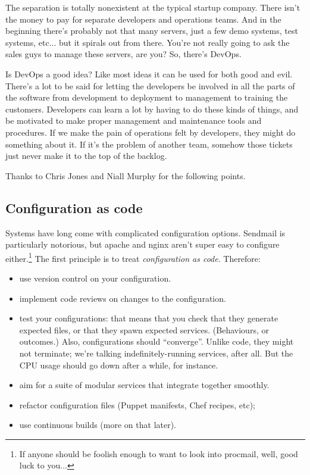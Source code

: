 \documentclass[a4paper]{report}
\begin{document}
The separation is totally nonexistent at the typical startup company. There isn't the money to pay for separate developers and operations teams. And in the beginning there's probably not that many servers, just a few demo systems, test systems, etc... but it spirals out from there. You're not really going to ask the sales guys to manage these servers, are you? So, there's DevOps. 

Is DevOps a good idea? Like most ideas it can be used for both good and evil. There's a lot to be said for letting the developers be involved in all the parts of the software from development to deployment to management to training the customers. Developers can learn a lot by having to do these kinds of things, and be motivated to make proper management and maintenance tools and procedures. If we make the pain of operations felt by developers, they might do something about it. If it's the problem of another team, somehow those tickets just never make it to the top of the backlog.

Thanks to Chris Jones and Niall Murphy for the following points.

\subsection*{Configuration as code}
Systems have long come with complicated configuration options.
Sendmail is particularly notorious, but apache and nginx aren't super
easy to configure either.\footnote{If anyone should be foolish enough to want to look into procmail, well, good luck to you...} The first principle is to treat \emph{configuration as code}.
Therefore:
\begin{itemize}
\item use version control on your configuration.
\item implement code reviews on changes to the configuration.
\item test your configurations: that means that you check that they
  generate expected files, or that they spawn expected
  services. (Behaviours, or outcomes.) Also, configurations should
  ``converge''. Unlike code, they might not terminate; we're talking
  indefinitely-running services, after all. But the CPU usage should
  go down after a while, for instance.
\item aim for a suite of modular services that integrate together smoothly.
\item refactor configuration files (Puppet manifests, Chef recipes, etc);
\item use continuous builds (more on that later).
\end{itemize}
\end{document}
